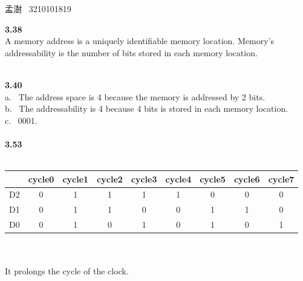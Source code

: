 \documentclass[a4paper,12pt]{article}     %
\begin{document}
\begin{center}   %
孟澍 \ 3210101819
\end{center}

\noindent %
\textbf{3.38}\\
A memory address is a uniquely identifiable memory location. Memory's addressability is the number of bits stored in each memory location.

~\\
\textbf{3.40}\\
a. \ The address space is 4 because the memory is addressed by 2 bits.\\
b. \ The addressability is 4 because 4 bits is stored in each memory location.\\
c. \ 0001.\\

~\\
\textbf{3.53}\\
~\\
\begin{tabular}{c|c|c|c|c|c|c|c|c|}
  \hline
  & cycle0 & cycle1 & cycle2 & cycle3 & cycle4 & cycle5 & cycle6 & cycle7 \\
  \hline
  D2 & 0 & 1 & 1 & 1 & 1 & 0 & 0 & 0 \\
  \hline
  D1 & 0 & 1 & 1 & 0 & 0 & 1 & 1 & 0 \\
  \hline
  D0 & 0 & 1 & 0 & 1 & 0 & 1 & 0 & 1 \\
  \hline
\end{tabular}
\\
~\\
It prolongs the cycle of the clock.
\end{document}
